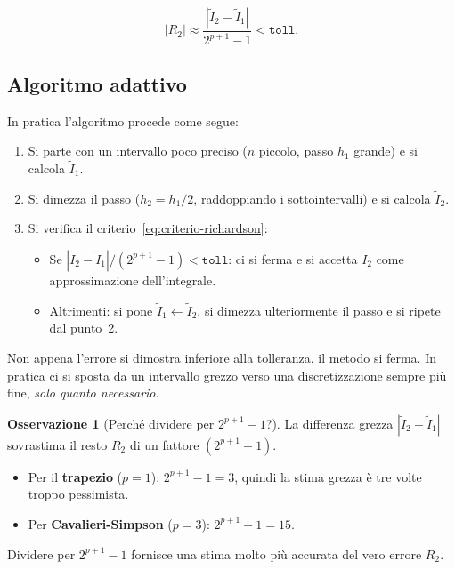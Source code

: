 \documentclass[a4paper,12pt]{article}
\theoremstyle{definition}
\newtheorem{osservazione}{Osservazione}[section]
\theoremstyle{remark}
\begin{document}
\begin{equation}
  |R_2| \approx \frac{|\tilde{I}_2 - \tilde{I}_1|}{2^{p+1}-1} < \mathtt{toll}.
  \label{eq:criterio-richardson}
\end{equation}

\subsection{Algoritmo adattivo}

In pratica l'algoritmo procede come segue:
\begin{enumerate}
  \item Si parte con un intervallo poco preciso ($n$ piccolo, passo $h_1$
        grande) e si calcola $\tilde{I}_1$.
  \item Si dimezza il passo ($h_2 = h_1/2$, raddoppiando i sottointervalli)
        e si calcola $\tilde{I}_2$.
  \item Si verifica il criterio~\eqref{eq:criterio-richardson}:
    \begin{itemize}
      \item Se $|\tilde{I}_2 - \tilde{I}_1|/(2^{p+1}-1) < \mathtt{toll}$:
            ci si ferma e si accetta $\tilde{I}_2$ come approssimazione
            dell'integrale.
      \item Altrimenti: si pone $\tilde{I}_1 \leftarrow \tilde{I}_2$,
            si dimezza ulteriormente il passo e si ripete dal punto~2.
    \end{itemize}
\end{enumerate}

Non appena l'errore si dimostra inferiore alla tolleranza, il metodo si
ferma. In pratica ci si sposta da un intervallo grezzo verso una
discretizzazione sempre più fine, \emph{solo quanto necessario}.

\begin{osservazione}[Perché dividere per $2^{p+1}-1$?]
La differenza grezza $|\tilde{I}_2 - \tilde{I}_1|$ sovrastima il resto $R_2$
di un fattore $(2^{p+1}-1)$.
\begin{itemize}
  \item Per il \textbf{trapezio} ($p=1$): $2^{p+1}-1 = 3$, quindi la
        stima grezza è tre volte troppo pessimista.
  \item Per \textbf{Cavalieri-Simpson} ($p=3$): $2^{p+1}-1 = 15$.
\end{itemize}
Dividere per $2^{p+1}-1$ fornisce una stima molto più accurata del
vero errore $R_2$.
\end{osservazione}
\end{document}

